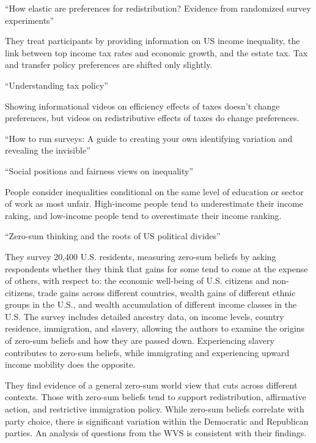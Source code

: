 \documentclass{article}
\begin{document}
\noindent \textbf{\cite{kuziemko2015elastic}} ``How elastic are preferences for redistribution? Evidence from randomized survey experiments''

They treat participants by providing information on US income inequality, the link between top income tax rates and economic growth, and the estate tax. Tax and transfer policy preferences are shifted only slightly.

\medskip \noindent \textbf{\cite{stantcheva2021understanding}} ``Understanding tax policy''

Showing informational videos on efficiency effects of taxes doesn't change preferences, but videos on redistributive effects of taxes do change preferences.

\medskip \noindent \textbf{\cite{stantcheva2023run}} ``How to run surveys: A guide to creating your own identifying variation and revealing the invisible''

\medskip \noindent \textbf{\cite{hvidberg2023social}} ``Social positions and fairness views on inequality''

People consider inequalities conditional on the same level of education or sector of work as most unfair. High-income people tend to underestimate their income raking, and low-income people tend to overestimate their income ranking. 

\medskip \noindent \textbf{\cite{chinoy2025zero}} ``Zero-sum thinking and the roots of US political divides''

They survey 20,400 U.S. residents, measuring zero-sum beliefs by asking respondents whether they think that gains for some tend to come at the expense of others, with respect to: the economic well-being of U.S. citizens and non-citizens, trade gains across different countries, wealth gains of different ethnic groups in the U.S., and wealth accumulation of different income classes in the U.S. The survey includes detailed ancestry data, on income levels, country residence, immigration, and slavery, allowing the authors to examine the origins of zero-sum beliefs and how they are passed down. Experiencing slavery contributes to zero-sum beliefs, while immigrating and experiencing upward income mobility does the opposite.

They find evidence of a general zero-sum world view that cuts across different contexts. Those with zero-sum beliefs tend to support redistribution, affirmative action, and restrictive immigration policy. While zero-sum beliefs correlate with party choice, there is significant variation within the Democratic and Republican parties. An analysis of questions from the WVS is consistent with their findings.
\end{document}

